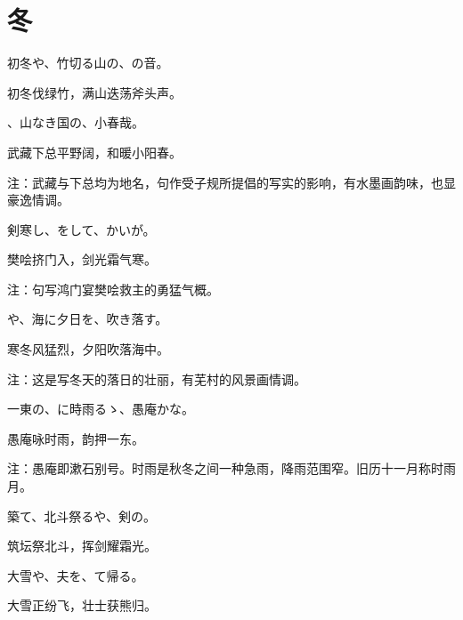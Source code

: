 \section{\FK 冬}

\setcounter{haikucounter}{0}

\begin{haiku}
    {\FH 初冬や、竹切る山の、の音。}

    {\FK 初冬伐绿竹，满山迭荡斧头声。}
\end{haiku}

\begin{haiku}
    {\FH {}、山なき国の、小春哉。}

    {\FK 武藏下总平野阔，和暖小阳春。}

    {\FT 注：武藏与下总均为地名，句作受子规所提倡的写实的影响，有水墨画韵味，也显豪逸情调。}
\end{haiku}

\begin{haiku}
    {\FH 剣寒し、をして、かいが。}

    {\FK 樊哙挤门入，剑光霜气寒。}

    {\FT 注：句写鸿门宴樊哙救主的勇猛气概。}
\end{haiku}

\begin{haiku}
    {\FH {}や、海に夕日を、吹き落す。}

    {\FK 寒冬风猛烈，夕阳吹落海中。}

    {\FT 注：这是写冬天的落日的壮丽，有芜村的风景画情调。}
\end{haiku}

\begin{haiku}
    {\FH 一東の、に時雨るゝ、愚庵かな。}

    {\FK 愚庵咏时雨，韵押一东。}

    {\FT 注：愚庵即漱石别号。时雨是秋冬之间一种急雨，降雨范围窄。旧历十一月称时雨月。}
\end{haiku}

\begin{haiku}
    {\FH {}築て、北斗祭るや、剣の。}

    {\FK 筑坛祭北斗，挥剑耀霜光。}
\end{haiku}

\begin{haiku}
    {\FH 大雪や、夫を、て帰る。}

    {\FK 大雪正纷飞，壮士获熊归。}
\end{haiku}

